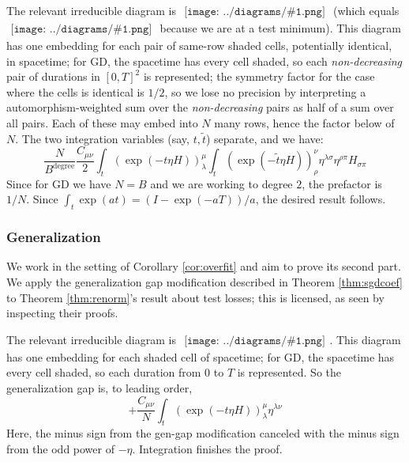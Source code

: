 \documentclass{article}
\theoremstyle{plain}
\theoremstyle{definition}
\newcommand{\wrap}[1]{\left(#1\right)}
\newcommand{\sdia}[1]{\begin{gathered}\texttt{[image: ../diagrams/\#1.png]}\end{gathered}}
\begin{document}
            The relevant irreducible diagram is $\sdia{(01-2)(02-12)}$ (which
            equals $\sdia{c(01-2)(02-12)}$ because we are at a test minimum).
            This diagram has one embedding for each pair of same-row shaded
            cells, potentially identical, in spacetime; for GD, the spacetime
            has every cell shaded, so each \emph{non-decreasing} pair of
            durations in $[0,T]^2$ is represented; the symmetry factor for the
            case where the cells is identical is $1/2$, so we lose no precision 
            by interpreting a automorphism-weighted sum over the
            \emph{non-decreasing} pairs as half of a sum over all pairs.
            Each of these may embed into $N$ many rows, hence the factor below
            of $N$.
            The two integration variables (say, $t, \tilde t$) separate, and we
            have:
            $$
                \frac{N}{B^{\text{degree}}}
                \frac{C_{\mu\nu}}{2}
                \int_t \wrap{\exp(-t \eta H)}^\mu_\lambda
                \int_{\tilde t} \wrap{\exp(-\tilde t \eta H)}^\nu_\rho
                \eta^{\lambda\sigma}
                \eta^{\rho\pi}
                H_{\sigma\pi}
            $$
            Since for GD we have $N=B$ and we are working to degree $2$, the
            prefactor is $1/N$.
            Since $\int_t \exp(a t) = (I-\exp(-a T))/a$, the desired result
            follows. 

        \subsubsection*{Generalization}
            We work in the setting of Corollary \ref{cor:overfit} and aim to
            prove its second part.  We apply the generalization gap
            modification described in Theorem \ref{thm:sgdcoef} to Theorem
            \ref{thm:renorm}'s result about test losses; this is licensed, as
            seen by inspecting their proofs.  

            The relevant irreducible diagram is $\sdia{c(01)(01)}$.  This
            diagram has one embedding for each shaded cell of spacetime;
            for GD, the spacetime has every cell shaded, so each duration from
            $0$ to $T$ is represented.  So the generalization gap is, to
            leading order,
            $$
                + \frac{C_{\mu\nu}}{N}
                \int_t \wrap{\exp(-t \eta H)}^\mu_\lambda
                \eta^{\lambda\nu}
            $$
            Here, the minus sign from the gen-gap modification canceled with
            the minus sign from the odd power of $-\eta$.
            Integration finishes the proof.
 
\end{document}
